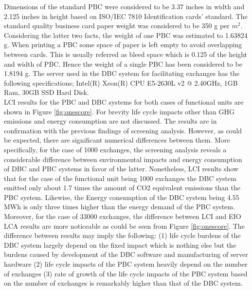 \documentclass[3p,times,procedia]{elsarticle}
\begin{document}
Dimensions of the standard PBC were considered to be 3.37 inches in width and 2.125 inches in height based on ISO/IEC 7810 Identification cards' standard.  The standard quality business card paper weight was considered to be 350 g per $m^2$. Considering the latter two facts, the weight of one PBC was estimated to 1.63824 g. When printing a PBC some space of paper is left empty to avoid overlapping between cards. This is usually referred as bleed space which is 0.125 of the height and width of PBC. Hence the weight of a single PBC has been considered to be 1.8194 g. The server used in the DBC system for facilitating exchanges has the following specifications; Intel(R) Xeon(R) CPU E5-2630L v2 @ 2.40GHz, 1GB Ram, 30GB SSD Hard Disk.\\

LCI results for the PBC and DBC systems for both cases of functional units are shown in Figure \ref{fig:onescore}. For brevity life cycle impacts other than GHG emissions and energy consumption are not discussed. The results are in confirmation with the previous findings of screening analysis. However, as could be expected, there are significant numerical differences between them. More specifically, for the case of 1000 exchanges, the screening analysis reveals a considerable difference between environmental impacts and energy consumption of DBC and PBC systems in favor of the latter. Nonetheless, LCI results show that for the case of the functional unit being 1000 exchanges the DBC system emitted only about 1.7 times the amount of CO2 equivalent emissions than the PBC system. Likewise, the Energy consumption of the DBC system being 4.55 MWh is only three times higher than the energy demand of the PBC system. Moreover, for the case of 33000 exchanges, the difference between LCI and EIO LCA results are more noticeable as could be seen from Figure \ref{fig:onescore}. The difference between results may imply the following: (1) life cycle burdens of the DBC system largely depend on the fixed impact which is nothing else but the burdens caused by development of the DBC software and manufacturing of server hardware (2) life cycle impacts of the PBC system heavily depend on the number of exchanges (3) rate of growth of the life cycle impacts of the PBC system based on the number of exchanges is remarkably higher than that of the DBC system.
\end{document}
